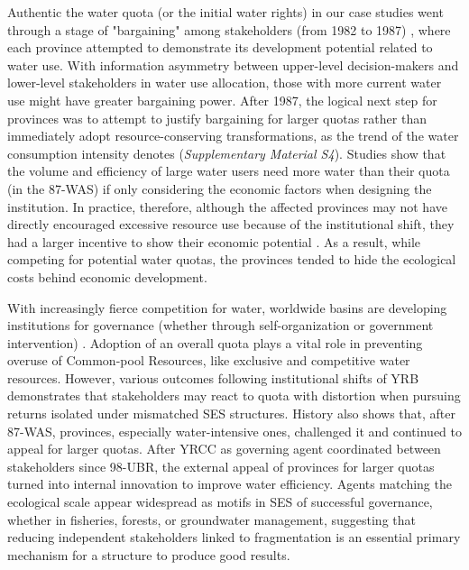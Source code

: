 Authentic the water quota (or the initial water rights) in our case studies went through a stage of "bargaining" among stakeholders (from 1982 to 1987) \cite{wang2019a, wang2019d}, where each province attempted to demonstrate its development potential related to water use.
With information asymmetry between upper-level decision-makers and lower-level stakeholders in water use allocation, those with more current water use might have greater bargaining power.
After 1987, the logical next step for provinces was to attempt to justify bargaining for larger quotas rather than immediately adopt resource-conserving transformations, as the trend of the water consumption intensity denotes (\textit{Supplementary Material S4}).
Studies show that the volume and efficiency of large water users need more water than their quota (in the 87-WAS) if only considering the economic factors when designing the institution.
In practice, therefore, although the affected provinces may not have directly encouraged excessive resource use because of the institutional shift, they had a larger incentive to show their economic potential
\cite{krieger1955, ostrom1990}.
As a result, while competing for potential water quotas, the provinces tended to hide the ecological costs behind economic development.

With increasingly fierce competition for water, worldwide basins are developing institutions for governance (whether through self-organization or government intervention) \cite{andersson2020, wutich2009, cumming2020b}.
Adoption of an overall quota plays a vital role in preventing overuse of Common-pool Resources, like exclusive and competitive water resources.
However, various outcomes following institutional shifts of YRB demonstrates that stakeholders may react to quota with distortion when pursuing returns isolated under mismatched SES structures.
History also shows that, after 87-WAS, provinces, especially water-intensive ones, challenged it and continued to appeal for larger quotas.
After YRCC as governing agent coordinated between stakeholders since 98-UBR, the external appeal of provinces for larger quotas turned into internal innovation to improve water efficiency.
Agents matching the ecological scale appear widespread as motifs in SES of successful governance, whether in fisheries, forests, or groundwater management, suggesting that reducing independent stakeholders linked to fragmentation is an essential primary mechanism for a structure to produce good results.
